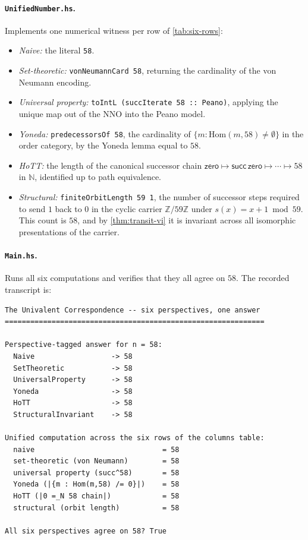 \documentclass[12pt]{article}
\theoremstyle{definition}
\theoremstyle{remark}
\newcommand{\N}{\mathbb{N}}
\newcommand{\zero}{\mathsf{zero}}
\begin{document}
\paragraph{\normalfont\texttt{UnifiedNumber.hs}.} Implements one numerical witness
per row of \cref{tab:six-rows}:
\begin{itemize}
\item \emph{Naive:} the literal \verb|58|.
\item \emph{Set-theoretic:} \verb|vonNeumannCard 58|, returning the
cardinality of the von Neumann encoding.
\item \emph{Universal property:} \verb|toIntL (succIterate 58 :: Peano)|,
applying the unique map out of the NNO into the Peano model.
\item \emph{Yoneda:} \verb|predecessorsOf 58|, the cardinality of
$\{m : \mathrm{Hom}(m, 58) \neq \emptyset\}$ in the order category, by
the Yoneda lemma equal to $58$.
\item \emph{HoTT:} the length of the canonical successor chain
$\zero \mapsto \mathsf{succ}\,\zero \mapsto \cdots \mapsto 58$ in
$\N$, identified up to path equivalence.
\item \emph{Structural:} \verb|finiteOrbitLength 59 1|, the number of
successor steps required to send $1$ back to $0$ in the cyclic carrier
$\mathbb{Z}/59\mathbb{Z}$ under $s(x) = x + 1 \bmod 59$. This count is
$58$, and by \cref{thm:transit-vi} it is invariant across all isomorphic
presentations of the carrier.
\end{itemize}

\paragraph{\normalfont\texttt{Main.hs}.} Runs all six computations and verifies that
they all agree on $58$. The recorded transcript is:
\begin{lstlisting}[language={}]
The Univalent Correspondence -- six perspectives, one answer
=============================================================

Perspective-tagged answer for n = 58:
  Naive                  -> 58
  SetTheoretic           -> 58
  UniversalProperty      -> 58
  Yoneda                 -> 58
  HoTT                   -> 58
  StructuralInvariant    -> 58

Unified computation across the six rows of the columns table:
  naive                              = 58
  set-theoretic (von Neumann)        = 58
  universal property (succ^58)       = 58
  Yoneda (|{m : Hom(m,58) /= 0}|)    = 58
  HoTT (|0 =_N 58 chain|)            = 58
  structural (orbit length)          = 58

All six perspectives agree on 58? True
\end{lstlisting}
\end{document}

